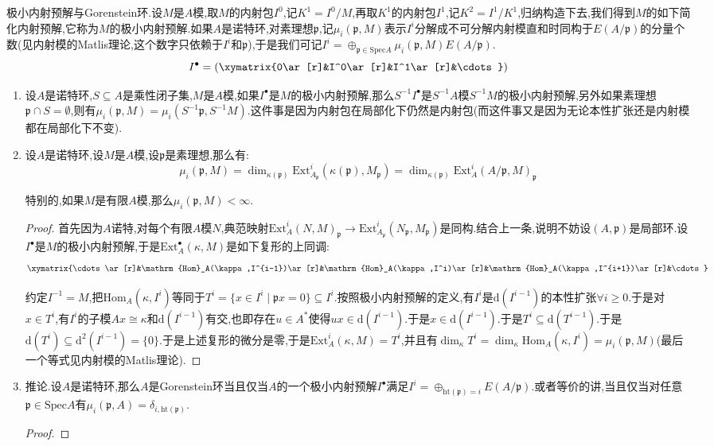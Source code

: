 极小内射预解与Gorenstein环.设$M$是$A$模,取$M$的内射包$I^0$,记$K^1=I^0/M$,再取$K^1$的内射包$I^1$,记$K^2=I^1/K^1$,归纳构造下去,我们得到$M$的如下简化内射预解,它称为$M$的极小内射预解.如果$A$是诺特环,对素理想$\mathfrak{p}$,记$\mu_i(\mathfrak{p},M)$表示$I^i$分解成不可分解内射模直和时同构于$E(A/\mathfrak{p})$的分量个数(见内射模的Matlis理论,这个数字只依赖于$I^i$和$\mathfrak{p}$),于是我们可记$I^i=\oplus_{\mathfrak{p}\in\mathrm{Spec}A}\mu_i(\mathfrak{p},M)E(A/\mathfrak{p})$.
$$I^{\bullet}=\left(\xymatrix{0\ar[r]&I^0\ar[r]&I^1\ar[r]&\cdots}\right)$$
\begin{enumerate}
	\item 设$A$是诺特环,$S\subseteq A$是乘性闭子集,$M$是$A$模,如果$I^{\bullet}$是$M$的极小内射预解,那么$S^{-1}I^{\bullet}$是$S^{-1}A$模$S^{-1}M$的极小内射预解,另外如果素理想$\mathfrak{p}\cap S=\emptyset$,则有$\mu_i(\mathfrak{p},M)=\mu_i(S^{-1}\mathfrak{p},S^{-1}M)$.这件事是因为内射包在局部化下仍然是内射包(而这件事又是因为无论本性扩张还是内射模都在局部化下不变).
	\item 设$A$是诺特环,设$M$是$A$模,设$\mathfrak{p}$是素理想,那么有:
	$$\mu_i(\mathfrak{p},M)=\dim_{\kappa(\mathfrak{p})}\mathrm{Ext}_{A_{\mathfrak{p}}}^i(\kappa(\mathfrak{p}),M_{\mathfrak{p}})=\dim_{\kappa(\mathfrak{p})}\mathrm{Ext}_A^i(A/\mathfrak{p},M)_{\mathfrak{p}}$$
	
	特别的,如果$M$是有限$A$模,那么$\mu_i(\mathfrak{p},M)<\infty$.
	\begin{proof}
		
		首先因为$A$诺特,对每个有限$A$模$N$,典范映射$\mathrm{Ext}^i_A(N,M)_{\mathfrak{p}}\to\mathrm{Ext}_{A_{\mathfrak{p}}}^i(N_{\mathfrak{p}},M_{\mathfrak{p}})$是同构.结合上一条,说明不妨设$(A,\mathfrak{p})$是局部环.设$I^{\bullet}$是$M$的极小内射预解,于是$\mathrm{Ext}_A^{\bullet}(\kappa,M)$是如下复形的上同调:
		$$\xymatrix{\cdots\ar[r]&\mathrm{Hom}_A(\kappa,I^{i-1})\ar[r]&\mathrm{Hom}_A(\kappa,I^i)\ar[r]&\mathrm{Hom}_A(\kappa,I^{i+1})\ar[r]&\cdots}$$
		
		约定$I^{-1}=M$,把$\mathrm{Hom}_A(\kappa,I^i)$等同于$T^i=\{x\in I^i\mid\mathfrak{p}x=0\}\subseteq I^i$.按照极小内射预解的定义,有$I^i$是$\mathrm{d}(I^{i-1})$的本性扩张$\forall i\ge0$.于是对$x\in T^i$,有$I^i$的子模$Ax\cong\kappa$和$\mathrm{d}(I^{i-1})$有交,也即存在$u\in A^*$使得$ux\in\mathrm{d}(I^{i-1})$.于是$x\in\mathrm{d}(I^{i-1})$.于是$T^i\subseteq\mathrm{d}(T^{i-1})$.于是$\mathrm{d}(T^i)\subseteq\mathrm{d}^2(I^{i-1})=\{0\}$.于是上述复形的微分是零,于是$\mathrm{Ext}_A^i(\kappa,M)=T^i$,并且有$\dim_{\kappa}T^i=\dim_{\kappa}\mathrm{Hom}_A(\kappa,I^i)=\mu_i(\mathfrak{p},M)$(最后一个等式见内射模的Matlis理论).
	\end{proof}
    \item 推论.设$A$是诺特环,那么$A$是Gorenstein环当且仅当$A$的一个极小内射预解$I^{\bullet}$满足$I^i=\oplus_{\mathrm{ht}(\mathfrak{p})=i}E(A/\mathfrak{p})$.或者等价的讲,当且仅当对任意$\mathfrak{p}\in\mathrm{Spec}A$有$\mu_i(\mathfrak{p},A)=\delta_{i,\mathrm{ht}(\mathfrak{p})}$.
    \begin{proof}
    	

\end{proof}
\end{enumerate}
